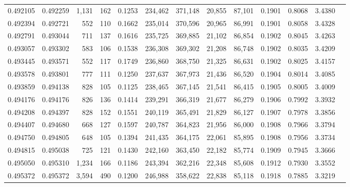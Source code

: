 \begin{tabular}{rrrrrrrrrrrrr}
0.492105 & 0.492259 & 1,131 &   162 &                                     0.1253 & 234,462 & 371,148 &  20,855 &  87,101 & 0.1901 & 0.8068 & 3.4380 \\
0.492394 & 0.492721 &   552 &   110 &                                     0.1662 & 235,014 & 370,596 &  20,965 &  86,991 & 0.1901 & 0.8058 & 3.4328 \\
0.492791 & 0.493044 &   711 &   137 &                                     0.1616 & 235,725 & 369,885 &  21,102 &  86,854 & 0.1902 & 0.8045 & 3.4263 \\
0.493057 & 0.493302 &   583 &   106 &                                     0.1538 & 236,308 & 369,302 &  21,208 &  86,748 & 0.1902 & 0.8035 & 3.4209 \\
0.493445 & 0.493571 &   552 &   117 &                                     0.1749 & 236,860 & 368,750 &  21,325 &  86,631 & 0.1902 & 0.8025 & 3.4157 \\
0.493578 & 0.493801 &   777 &   111 &                                     0.1250 & 237,637 & 367,973 &  21,436 &  86,520 & 0.1904 & 0.8014 & 3.4085 \\
0.493859 & 0.494138 &   828 &   105 &                                     0.1125 & 238,465 & 367,145 &  21,541 &  86,415 & 0.1905 & 0.8005 & 3.4009 \\
0.494176 & 0.494176 &   826 &   136 &                                     0.1414 & 239,291 & 366,319 &  21,677 &  86,279 & 0.1906 & 0.7992 & 3.3932 \\
0.494208 & 0.494397 &   828 &   152 &                                     0.1551 & 240,119 & 365,491 &  21,829 &  86,127 & 0.1907 & 0.7978 & 3.3856 \\
0.494407 & 0.494680 &   668 &   127 &                                     0.1597 & 240,787 & 364,823 &  21,956 &  86,000 & 0.1908 & 0.7966 & 3.3794 \\
0.494750 & 0.494805 &   648 &   105 &                                     0.1394 & 241,435 & 364,175 &  22,061 &  85,895 & 0.1908 & 0.7956 & 3.3734 \\
0.494815 & 0.495038 &   725 &   121 &                                     0.1430 & 242,160 & 363,450 &  22,182 &  85,774 & 0.1909 & 0.7945 & 3.3666 \\
0.495050 & 0.495310 & 1,234 &   166 &                                     0.1186 & 243,394 & 362,216 &  22,348 &  85,608 & 0.1912 & 0.7930 & 3.3552 \\
0.495372 & 0.495372 & 3,594 &   490 &                                     0.1200 & 246,988 & 358,622 &  22,838 &  85,118 & 0.1918 & 0.7885 & 3.3219 \\

\end{tabular}
